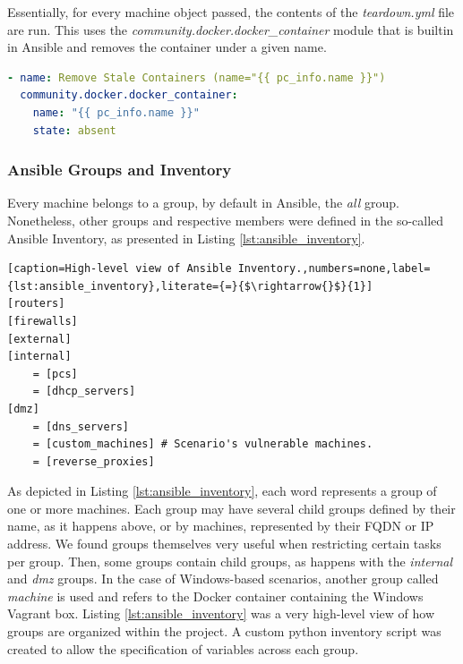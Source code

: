 Essentially, for every machine object passed, the contents of the \textit{teardown.yml} file are run. This uses the \textit{community.docker.docker\_container} module that is builtin in Ansible and removes the container under a given name.

\begin{lstlisting}[language=yaml,caption=File \textit{teardown.yml}.,numbers=none,label={lst:ansible_teardown}]
- name: Remove Stale Containers (name="{{ pc_info.name }}")
  community.docker.docker_container:
    name: "{{ pc_info.name }}"
    state: absent
\end{lstlisting}

\subsubsection{Ansible Groups and Inventory} \label{sec:ansible_groups_inventory}


Every machine belongs to a group, by default in Ansible, the \textit{all} group. Nonetheless, other groups and respective members were defined in the so-called Ansible Inventory, as presented in Listing \ref{lst:ansible_inventory}.

\begin{lstlisting}[caption=High-level view of Ansible Inventory.,numbers=none,label={lst:ansible_inventory},literate={=}{$\rightarrow{}$}{1}]
[routers]
[firewalls]
[external]
[internal]
    = [pcs]
    = [dhcp_servers]
[dmz]
    = [dns_servers]
    = [custom_machines] # Scenario's vulnerable machines.
    = [reverse_proxies]
\end{lstlisting}

As depicted in Listing \ref{lst:ansible_inventory}, each word represents a group of one or more machines. Each group may have several child groups defined by their name, as it happens above, or by machines, represented by their FQDN or IP address. We found groups themselves very useful when restricting certain tasks per group. Then, some groups contain child groups, as happens with the \textit{internal} and \textit{dmz} groups. In the case of Windows-based scenarios, another group called \textit{machine} is used and refers to the Docker container containing the Windows Vagrant box. Listing \ref{lst:ansible_inventory} was a very high-level view of how groups are organized within the project. A custom python inventory script was created to allow the specification of variables across each group.

